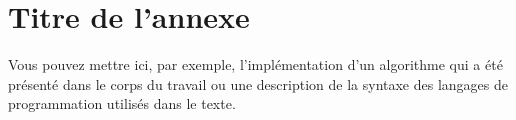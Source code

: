 \chapter{Titre de l'annexe}

Vous pouvez mettre ici, par exemple, l’implémentation d’un algorithme qui a été présenté dans le corps du travail ou une description de la syntaxe des langages de programmation utilisés dans le texte.
